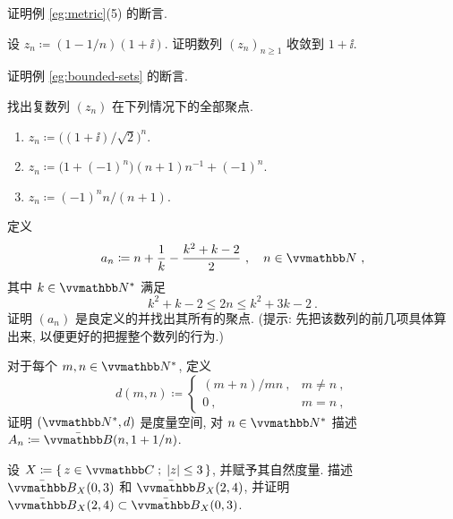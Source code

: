 \begin{exercise}
    证明例 \ref{eg:metric}(5) 的断言.
\end{exercise}

\begin{exercise}
    设 \(z_n \coloneqq (1 - 1 / n)(1 + \ii)\). 证明数列 \((z_n)_{n \geq 1}\) 收敛到 \(1 + \ii\).
\end{exercise}

\begin{exercise}
    证明例 \ref{eg:bounded-sets} 的断言.
\end{exercise}

\begin{exercise}
    找出复数列 \((z_n)\) 在下列情况下的全部聚点.
    \begin{enumerate}
        \item \(z_n \coloneqq \bigl((1 + \ii) \big/ \sqrt{2}\bigr)^n\).
        \item \(z_n \coloneqq \bigl(1 + (- 1)^n\bigr) (n + 1) n^{- 1} + (- 1)^n\).
        \item \(z_n \coloneqq (- 1)^n n / (n + 1)\).
    \end{enumerate}
\end{exercise}

\begin{exercise}
    定义
    \[
        a_n \coloneqq n + \frac{1}{k} - \frac{k^2 + k - 2}{2}\ ,\quad n \in \N\ ,
    \]
    其中 \(k \in \N^\ast\) 满足
    \[
        k^2 + k - 2 \leq 2 n \leq k^2 + 3 k - 2\ .
    \]
    证明 \((a_n)\) 是良定义的并找出其所有的聚点. (提示: 先把该数列的前几项具体算出来, 以便更好的把握整个数列的行为.)
\end{exercise}

\begin{exercise}
    对于每个 \(m, n \in \N^\ast\), 定义
    \[
        d(m, n) \coloneqq
        \begin{cases}
            (m + n) / m n\ , & m \neq n\ , \\
            0\ ,             & m = n\ ,
        \end{cases}
    \]
    证明 \((\N^\ast, d)\) 是度量空间, 对 \(n \in \N^\ast\) 描述 \(A_n \coloneqq \bar \B(n, 1 + 1 / n)\).
\end{exercise}

\begin{exercise}
    设 \(X \coloneqq \{\, z \in \C \;;\; |z| \leq 3 \,\}\), 并赋予其自然度量. 描述 \(\bar \B_X(0, 3)\) 和 \(\bar \B_X(2, 4)\), 并证明 \(\bar \B_X(2, 4) \subset \bar \B_X(0, 3)\).
\end{exercise}

